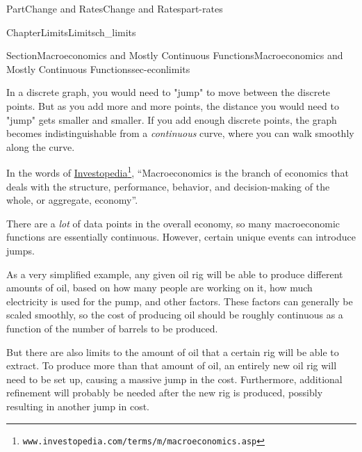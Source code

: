 \documentclass{tufte-book}
\numberwithin{equation}{chapter}
\begin{document}
\begin{partptx}{Part}{Change and Rates}{}{Change and Rates}{}{}{part-rates}
\begin{chapterptx}{Chapter}{Limits}{}{Limits}{}{}{ch_limits}
\begin{sectionptx}{Section}{Macroeconomics and Mostly Continuous Functions}{}{Macroeconomics and Mostly Continuous Functions}{}{}{sec-econlimits}
\begin{image}{0}{1}{0}{}
{
\qquad

}%
\end{image}%
 In a discrete graph, you would need to "jump" to move between the discrete points. But as you add more and more points, the distance you would need to "jump" gets smaller and smaller. If you add enough discrete points, the graph becomes indistinguishable from a \emph{continuous} curve, where you can walk smoothly along the curve.%
\par
In the words of \href{https://www.investopedia.com/terms/m/macroeconomics.asp}{Investopedia}\footnote{\nolinkurl{www.investopedia.com/terms/m/macroeconomics.asp}\label{sec-econlimits-3-2}}, ``Macroeconomics is the branch of economics that deals with the structure, performance, behavior, and decision-making of the whole, or aggregate, economy''.%
\par
There are a \emph{lot} of data points in the overall economy, so many macroeconomic functions are essentially continuous. However, certain unique events can introduce jumps.%
\par
As a very simplified example, any given oil rig will be able to produce different amounts of oil, based on how many people are working on it, how much electricity is used for the pump, and other factors. These factors can generally be scaled smoothly, so the cost of producing oil should be roughly continuous as a function of the number of barrels to be produced.%
\par
But there are also limits to the amount of oil that a certain rig will be able to extract.  To produce more than that amount of oil, an entirely new oil rig will need to be set up, causing a massive jump in the cost. Furthermore, additional refinement will probably be needed after the new rig is produced, possibly resulting in another jump in cost.%

\end{sectionptx}
\end{chapterptx}
\end{partptx}
\end{document}
